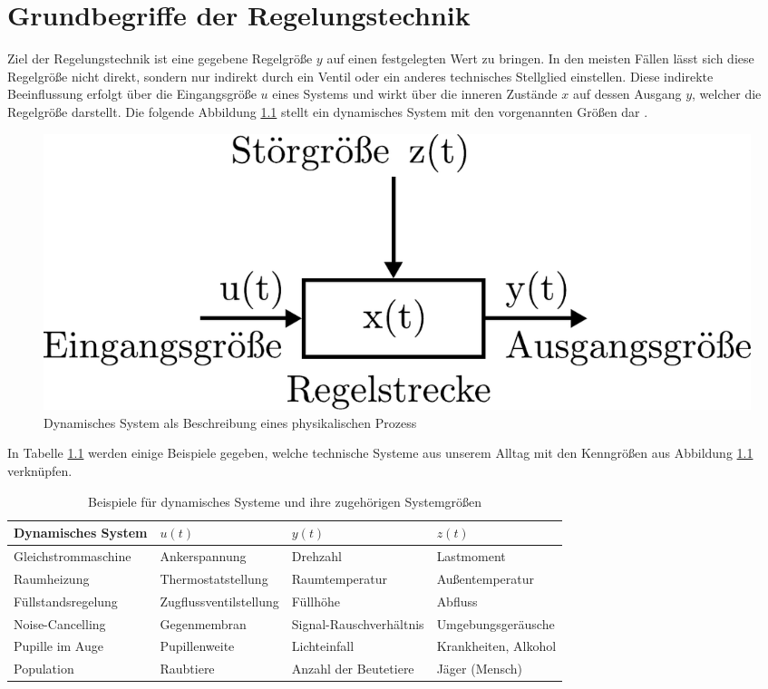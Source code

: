 \chapter{Grundbegriffe der Regelungstechnik}
%
Ziel der Regelungstechnik ist eine gegebene Regelgröße $y$ auf einen festgelegten Wert zu bringen. In den meisten Fällen lässt sich diese Regelgröße nicht direkt, sondern nur indirekt durch ein Ventil oder ein anderes technisches Stellglied einstellen. Diese indirekte Beeinflussung erfolgt über die Eingangsgröße $u$ eines Systems und wirkt über die inneren Zustände $x$ auf dessen Ausgang $y$, welcher die Regelgröße darstellt. Die folgende Abbildung \ref{fig:dynamischessystem} stellt ein dynamisches System mit den vorgenannten Größen dar \cite{Foellinger94}.
%
\begin{figure}[h]
	\centering
	\includegraphics[width=0.5\linewidth]{Abbildungen/Grundbegriffe/PDF/DynamischesSystem.pdf}
	\caption{Dynamisches System als Beschreibung eines physikalischen Prozess}
	\label{fig:dynamischessystem}
\end{figure}
%
In Tabelle \ref{tab:beispieledynsystem} werden einige Beispiele gegeben, welche technische Systeme aus unserem Alltag mit den Kenngrößen aus Abbildung \ref{fig:dynamischessystem} verknüpfen.
%
\begin{table}[h]\centering
	\caption{Beispiele für dynamisches Systeme und ihre zugehörigen Systemgrößen}
	\begin{tabular}{@{}llll@{}}\toprule
		Dynamisches System & $u(t)$ & $y(t)$ & $z(t)$ \\ \bottomrule\bottomrule
		Gleichstrommaschine & Ankerspannung & Drehzahl & Lastmoment \\
		Raumheizung & Thermostatstellung & Raumtemperatur & Außentemperatur \\
		Füllstandsregelung & Zugflussventilstellung & Füllhöhe & Abfluss \\
		Noise-Cancelling & Gegenmembran & Signal-Rauschverhältnis & Umgebungsgeräusche\\
		Pupille im Auge & Pupillenweite & Lichteinfall & Krankheiten, Alkohol\\
		Population & Raubtiere & Anzahl der Beutetiere & Jäger (Mensch)\\
		\bottomrule
	\end{tabular}
	\label{tab:beispieledynsystem}
\end{table}\newpage
